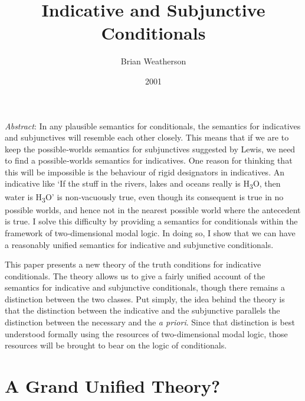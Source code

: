 \documentclass[
  11pt,
  letterpaper,
  DIV=11,
  numbers=noendperiod,
  twoside]{scrartcl}
\title{Indicative and Subjunctive Conditionals}
\author{Brian Weatherson}
\date{2001}
\renewenvironment{abstract}
 {\vspace{-1.25cm}
 \quotation\small\noindent\emph{Abstract}:}
 {\endquotation}
\renewenvironment{abstract}
 {\quotation\small\noindent\emph{Abstract}:}
 {\endquotation\vspace{-0.02cm}}
\begin{document}
\maketitle
\begin{abstract}
In any plausible semantics for conditionals, the semantics for
indicatives and subjunctives will resemble each other closely. This
means that if we are to keep the possible‐worlds semantics for
subjunctives suggested by Lewis, we need to find a possible‐worlds
semantics for indicatives. One reason for thinking that this will be
impossible is the behaviour of rigid designators in indicatives. An
indicative like `If the stuff in the rivers, lakes and oceans really is
H\textsubscript{3}O, then water is H\textsubscript{3}O' is non‐vacuously
true, even though its consequent is true in no possible worlds, and
hence not in the nearest possible world where the antecedent is true. I
solve this difficulty by providing a semantics for conditionals within
the framework of two‐dimensional modal logic. In doing so, I show that
we can have a reasonably unified semantics for indicative and
subjunctive conditionals.
\end{abstract}


This paper presents a new theory of the truth conditions for indicative
conditionals. The theory allows us to give a fairly unified account of
the semantics for indicative and subjunctive conditionals, though there
remains a distinction between the two classes. Put simply, the idea
behind the theory is that the distinction between the indicative and the
subjunctive parallels the distinction between the necessary and the
\emph{a priori}. Since that distinction is best understood formally
using the resources of two-dimensional modal logic, those resources will
be brought to bear on the logic of conditionals.

\section{A Grand Unified Theory?}\label{a-grand-unified-theory}
\end{document}
